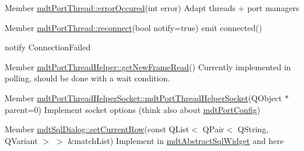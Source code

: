 \label{todo__todo000045}
\hypertarget{todo__todo000045}{}
 
\begin{DoxyDescription}
\item[Member \hyperlink{classmdt_port_thread_ab31cbe1a85aa830cd368654d1f806326}{mdtPortThread::errorOccured}(int error) ]Adapt threads + port managers
\end{DoxyDescription}

\label{todo__todo000043}
\hypertarget{todo__todo000043}{}
 
\begin{DoxyDescription}
\item[Member \hyperlink{classmdt_port_thread_abee1d2f9b67ca37cfd13e108ca978b36}{mdtPortThread::reconnect}(bool notify=true) ]emit connected() 

notify ConnectionFailed 
\end{DoxyDescription}

\label{todo__todo000046}
\hypertarget{todo__todo000046}{}
 
\begin{DoxyDescription}
\item[Member \hyperlink{classmdt_port_thread_helper_aed853f4cedc143c62e7dad5e38ff4b8c}{mdtPortThreadHelper::getNewFrameRead}() ]Currently implemented in polling, should be done with a wait condition.
\end{DoxyDescription}

\label{todo__todo000047}
\hypertarget{todo__todo000047}{}
 
\begin{DoxyDescription}
\item[Member \hyperlink{classmdt_port_thread_helper_socket_aa77afb8d26e4863bd437e0d59efae7a7}{mdtPortThreadHelperSocket::mdtPortThreadHelperSocket}(QObject $\ast$parent=0) ]Implement socket options (think also about \hyperlink{classmdt_port_config}{mdtPortConfig}) 
\end{DoxyDescription}

\label{todo__todo000080}
\hypertarget{todo__todo000080}{}
 
\begin{DoxyDescription}
\item[Member \hyperlink{classmdt_sql_dialog_ae98a1c76a8777664f09106f48386fd57}{mdtSqlDialog::setCurrentRow}(const QList$<$ QPair$<$ QString, QVariant $>$ $>$ \&matchList) ]Implement in \hyperlink{classmdt_abstract_sql_widget}{mdtAbstractSqlWidget} and here 
\end{DoxyDescription}

